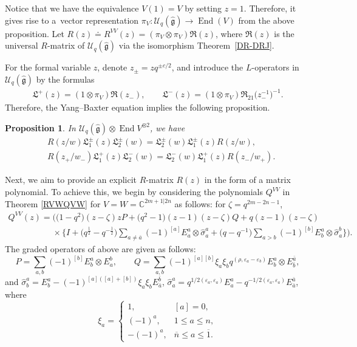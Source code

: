 \documentclass[pdftex]{sigma}
\numberwithin{equation}{section}
\newtheorem{Proposition}[Theorem]{Proposition}
 { \theoremstyle{definition}
\newtheorem{Definition}[Theorem]{Definition}
\newtheorem{Note}[Theorem]{Note}
\newtheorem{Example}[Theorem]{Example}
\newtheorem{Remark}[Theorem]{Remark} }
\begin{document}
Notice that we have the equivalence $V(1)=V$ by setting $z=1$. Therefore, it gives rise to a~vector representation
 $\pi_V\colon \mathcal{U}_q(\mathfrak{\hat{g}})\rightarrow \operatorname{End}(V)$ from the above proposition.
Let
$R(z)\doteq R^{VV}(z)=(\pi_V\otimes\pi_V)\mathfrak{R}(z)$,
where $\mathfrak{R}(z)$ is the universal $R$-matrix of $\mathcal{U}_q(\mathfrak{\hat{g}})$ via the isomorphism Theorem~\ref{DR-DRJ}.

{For the formal variable $z$, denote
$z_{\pm}=zq^{\pm c/2}$, and introduce the $L$-operators in $\mathcal{U}_q(\mathfrak{\hat{g}})$ by the formulas}
\begin{gather}\label{L-operators}
 \mathfrak{L}^+(z)=(1\otimes \pi_V)\mathfrak{R}(z_-), \qquad \mathfrak{L}^-(z)=(1\otimes \pi_V)\mathfrak{R}_{21}\bigl(z_-^{-1}\bigr)^{-1}.
\end{gather}
Therefore, the Yang--Baxter equation implies the following proposition.

\begin{Proposition}\label{U(ENDV)} In $\mathcal{U}_q(\mathfrak{\hat{g}})\otimes \operatorname{End}V^{\otimes2}$, we have
\begin{align*}
 &R(z/w)\mathfrak{L}_1^{\pm}(z)\mathfrak{L}_2^{\pm}(w)=\mathfrak{L}_2^{\pm}(w)\mathfrak{L}_1^{\pm}(z) R(z/w),\\
 &R(z_+/w_-)\mathfrak{L}_1^{+}(z)\mathfrak{L}_2^{-}(w)=\mathfrak{L}_2^{-}(w)\mathfrak{L}_1^{+}(z) R(z_-/w_+).
\end{align*}
\end{Proposition}

Next, we aim to provide an explicit $R$-matrix
$R(z)$ in the form of a matrix polynomial.
 To achieve this, we begin by considering the polynomials $Q^{VV}$ in Theorem \ref{RVWQVW} for $V=W=\mathbb{C}^{2m+1|2n}$ as follows: for $\zeta=q^{2m-2n-1}$,
\begin{gather*}
 Q^{VV}(z)=\bigl(\bigl(1-q^{2}\bigr)(z-\zeta)zP+\bigl(q^2-1\bigr)(z-1)(z-\zeta)Q+q(z-1)(z-\zeta)\nonumber\\
\phantom{ Q^{VV}(z)=}{}\times \biggl\{I+
 \bigl(q^{\frac{1}{2}}-q^{-\frac{1}{2}}\bigr)\sum\limits_{a\neq \overline{a}}(-1)^{[a]}E^a_a\otimes\hat{\sigma}^a_a+\bigl(q-q^{-1}\bigr)\sum\limits_{a> b}(-1)^{[b]}E^a_b\otimes \hat{\sigma}^b_a\biggr\}\biggr).
\end{gather*}
The graded operators of above are given as follows:
\[
 P=\sum\limits_{a,b}(-1)^{[b]}E^a_b\otimes E^b_a,\qquad
 Q=\sum\limits_{a,b}(-1)^{[a][b]}\xi_a\xi_bq^{(\rho,\varepsilon_a- \varepsilon_b)}E^a_b\otimes E^{\bar{a}}_{\bar{b}},
\]
and
$\hat{\sigma}^a_b=E^a_b-(-1)^{[a]([a]+[b])}\xi_a\xi_bE^{\bar{b}}_{\bar{a}}$, $
 \hat{\sigma}^a_a=q^{1/2(\varepsilon_a, \varepsilon_a)}E^a_a-q^{-1/2(\varepsilon_a, \varepsilon_a)}E^{\bar{a}}_{\bar{a}}$,
 where \[
 \xi_a=
 \begin{cases}
 1,&[a]=0,\\
 (-1)^a,& 1\leq a\leq n,\\
 -(-1)^a,& \overline{n}\leq a\leq \overline{1}.
 \end{cases}
\]
\end{document}
